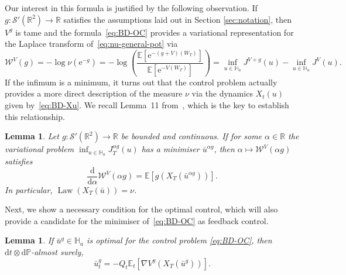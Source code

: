 \documentclass[11pt, a4paper]{scrartcl}
\numberwithin{equation}{section}
\theoremstyle{plain}
\newtheorem{lemma}[foo]{Lemma}
\theoremstyle{remark}
\newcommand{\mathd}{\mathrm{d}}
\newcommand{\mathe}{\mathrm{e}}
\newcommand{\tmop}[1]{\ensuremath{\operatorname{#1}}}
\begin{document}
Our interest in this formula is justified by the following observation. If $g
: \mathcal{S}' (\mathbb{R}^2) \rightarrow \mathbb{R}$ satisfies the
assumptions laid out in Section \ref{sec:notation}, then $V^g$ is tame and the
formula~\eqref{eq:BD-OC} provides a variational representation for the Laplace
transform of~\eqref{eq:nu-general-pot} via
\begin{equation}
  \mathcal{W}^V (g) = - \log \nu (\mathe^{- g}) = - \log \left(
  \frac{\mathbb{E} [\mathe^{- (g + V) (W_T)}]}{\mathbb{E} [\mathe^{- V
  (W_T)}]} \right) = \inf_{u \in \mathbb{H}_a} J^{V + g} (u) - \inf_{u \in
  \mathbb{H}_a} J^V (u) . \label{eq:def-WV}
\end{equation}
If the infimum is a minimum, it turns out that the control problem actually
provides a more direct description of the measure $\nu$ via the dynamics $X_t
(u)$ given by~\eqref{eq:BD-Xu}. We recall Lemma~11
from~{\cite{barashkovVariationalMethodEuclidean2023}}, which is the key to
establish this relationship.

\begin{lemma}
  \label{lem:dda-W}Let $g : \mathcal{S}' (\mathbb{R}^2) \rightarrow
  \mathbb{R}$ be bounded and continuous. If for some $\alpha \in \mathbb{R}$
  the variational problem $\inf_{u \in \mathbb{H}_a} J_T^{\alpha g} (u)$ has a
  minimiser $\bar{u}^{\alpha g}$, then $\alpha \mapsto \mathcal{W}^V (\alpha
  g)$ satisfies
  \[ \frac{\mathd}{\mathd \alpha}  \mathcal{W}^V (\alpha g) =\mathbb{E} [g
     (X_T (\bar{u}^{\alpha g}))] . \]
  In particular, $\tmop{Law} (X_T (\bar{u})) = \nu$.
\end{lemma}

Next, we show a necessary condition for the optimal control, which will also
provide a candidate for the minimiser of~\eqref{eq:BD-OC} as feedback control.

\begin{lemma}
  \label{lem:EL-cond}If $\bar{u}^g \in \mathbb{H}_a$ is optimal for the
  control problem \eqref{eq:BD-OC}, then $\mathd t \otimes \mathd \mathbb{P}$-almost
  surely,
  \begin{equation}
    \bar{u}_t^g = - Q_t \mathbb{E}_t [\nabla V^g (X_T (\bar{u}^g))] .
    \label{eq:optimal-u}
  \end{equation}
\end{lemma}
\end{document}
